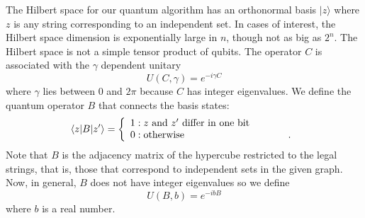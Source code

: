 \documentclass[t11pt,reprint,preprint,preprintnumbers]{revtex4}
\begin{document}
The Hilbert space for our quantum algorithm has an orthonormal basis $| z \rangle$ where $z$ is any string corresponding to an independent set.  In cases of interest, the Hilbert space dimension is exponentially large in $n$, though not as big as $2^n$.  The Hilbert space is not a simple tensor product of qubits.  The operator $C$ is associated with the $\gamma$ dependent unitary
\begin{equation}
U(C,\gamma) = e^{-i \gamma C}
\end{equation}
where $\gamma$ lies between 0 and $2\pi$ because $C$ has integer eigenvalues.  We define the quantum operator $B$ that connects the basis states:
\begin{equation}\label{eq:adjacency}
\langle z | B | z' \rangle = \left\{
     \begin{array}{lr}
       1 :  z \textnormal{ and }z' \textnormal{ differ in one bit}\\
       0 : \textnormal{otherwise\indent\indent\indent\indent\indent\indent\indent.}
     \end{array}
   \right. 
\end{equation}
Note that $B$ is the adjacency matrix of the hypercube restricted to the legal strings, that is, those that correspond to independent sets in the given graph.  Now, in general, $B$ does not have integer eigenvalues so we define
\begin{equation}
U(B,b) = e^{-i b B}
\end{equation}
\noindent where $b$ is a real number.  
\end{document}
